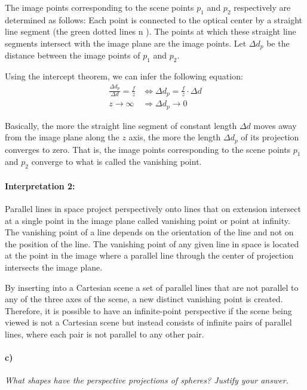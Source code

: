 \documentclass[a4paper,twocolumn]{article}
\newcommand{\subtask}[2]{\paragraph{#1)} \textit{#2} \newline}
\begin{document}
	The image points corresponding to the scene points $p_1$ and $p_2$ respectively are determined as follows: Each point is connected to the optical center by a straight line segment (the green dotted lines n ). The points at which these straight line segments intersect with the image plane are the image points. Let $\Delta d_p$ be the distance between the image points of $p_1$ and $p_2$.
	
	Using the intercept theorem, we can infer the following equation:
	\begin{align*}
		\frac{\Delta d_p}{\Delta d} = \frac{f}{z} &\Leftrightarrow
		\Delta d_p = \frac{f}{z} \cdot \Delta d \\
		z \rightarrow \infty &\Rightarrow \Delta d_p \rightarrow 0
	\end{align*}
	
	Basically, the more the straight line segment of constant length $\Delta d$ moves away from the image plane along the $z$ axis, the more the length $\Delta d_p$ of its projection converges to zero. That is, the image points corresponding to the scene points $p_1$ and $p_2$ converge to what is called the vanishing point.


	
	\paragraph{Interpretation 2:} Parallel lines in space project perspectively onto lines that on extension intersect at a single point in the image plane called vanishing point or point at infinity. The vanishing point of a line depends on the orientation of the line and not on the position of the line. The vanishing point of any given line in space is located at the point in the image where a parallel line through the center of projection intersects the image plane.
	
	By inserting into a Cartesian scene a set of parallel lines that are not parallel to any of the three axes of the scene, a new distinct vanishing point is created. Therefore, it is possible to have an infinite-point perspective if the scene being viewed is not a Cartesian scene but instead consists of infinite pairs of parallel lines, where each pair is not parallel to any other pair.
	
	\subtask{c}{What shapes have the perspective projections of spheres? Justify your answer.}
	
\end{document}
